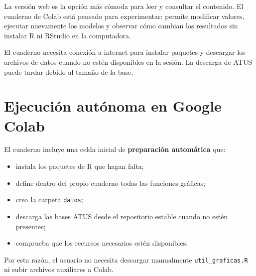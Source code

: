 \documentclass[
  spanish,
  10.5pt,
  letterpaper,
  openany,
  headings=big]{scrbook}
\providecommand{\tightlist}{%
  \setlength{\itemsep}{0pt}\setlength{\parskip}{0pt}}
\begin{document}
La versión web es la opción más cómoda para leer y consultar el
contenido. El cuaderno de Colab está pensado para experimentar: permite
modificar valores, ejecutar nuevamente los modelos y observar cómo
cambian los resultados sin instalar R ni RStudio en la computadora.

\begin{tcolorbox}[enhanced jigsaw, arc=.35mm, bottomrule=.15mm, bottomtitle=1mm, breakable, colback=white, colbacktitle=quarto-callout-note-color!10!white, colframe=quarto-callout-note-color-frame, coltitle=black, left=2mm, leftrule=.75mm, opacityback=0, opacitybacktitle=0.6, rightrule=.15mm, title=\textcolor{quarto-callout-note-color}{\faInfo}\hspace{0.5em}{Datos y acceso a internet}, titlerule=0mm, toprule=.15mm, toptitle=1mm]

El cuaderno necesita conexión a internet para instalar paquetes y
descargar los archivos de datos cuando no estén disponibles en la
sesión. La descarga de ATUS puede tardar debido al tamaño de la base.

\end{tcolorbox}

\section*{Ejecución autónoma en Google
Colab}\label{ejecuciuxf3n-autuxf3noma-en-google-colab}


El cuaderno incluye una celda inicial de \textbf{preparación automática}
que:

\begin{itemize}
\tightlist
\item
  instala los paquetes de R que hagan falta;
\item
  define dentro del propio cuaderno todas las funciones gráficas;
\item
  crea la carpeta \texttt{datos};
\item
  descarga las bases ATUS desde el repositorio estable cuando no estén
  presentes;
\item
  comprueba que los recursos necesarios estén disponibles.
\end{itemize}

Por esta razón, el usuario no necesita descargar manualmente
\texttt{util\_graficas.R} ni subir archivos auxiliares a Colab.
\end{document}
